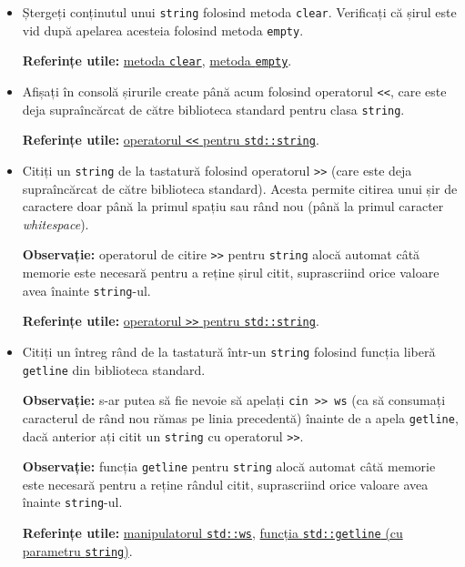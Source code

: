 \begin{enumerate}
\begin{itemize}
        \item Ștergeți conținutul unui \texttt{string} folosind metoda \texttt{clear}. Verificați că șirul este vid după apelarea acesteia folosind metoda \texttt{empty}.

        \textbf{Referințe utile:} \href{https://cplusplus.com/reference/string/string/clear/}{metoda \texttt{clear}}, \href{https://cplusplus.com/reference/string/string/empty/}{metoda \texttt{empty}}.

        \item Afișați în consolă șirurile create până acum folosind operatorul \texttt{<<}, care este deja supraîncărcat de către biblioteca standard pentru clasa \texttt{string}.

        \textbf{Referințe utile:} \href{https://cplusplus.com/reference/string/string/operator\%3C\%3C/}{operatorul \texttt{<<} pentru \texttt{std::string}}.

        \item Citiți un \texttt{string} de la tastatură folosind operatorul \texttt{>>} (care este deja supraîncărcat de către biblioteca standard). Acesta permite citirea unui șir de caractere doar până la primul spațiu sau rând nou (până la primul caracter \textit{whitespace}).

        \textbf{Observație:} operatorul de citire \texttt{>>} pentru \texttt{string} alocă automat câtă memorie este necesară pentru a reține șirul citit, suprascriind orice valoare avea înainte \texttt{string}-ul.

        \textbf{Referințe utile:} \href{https://cplusplus.com/reference/string/string/operator\%3E\%3E/}{operatorul \texttt{>>} pentru \texttt{std::string}}.

        \item Citiți un întreg rând de la tastatură într-un \texttt{string} folosind funcția liberă \texttt{getline} din biblioteca standard.

        \textbf{Observație:} s-ar putea să fie nevoie să apelați \texttt{cin >> ws} (ca să consumați caracterul de rând nou rămas pe linia precedentă) înainte de a apela \texttt{getline}, dacă anterior ați citit un \texttt{string} cu operatorul \texttt{>>}.

        \textbf{Observație:} funcția \texttt{getline} pentru \texttt{string} alocă automat câtă memorie este necesară pentru a reține rândul citit, suprascriind orice valoare avea înainte \texttt{string}-ul.
        
        \textbf{Referințe utile:} \href{https://cplusplus.com/reference/istream/ws/}{manipulatorul \texttt{std::ws}}, \href{https://cplusplus.com/reference/string/string/getline/}{funcția \texttt{std::getline} (cu parametru \texttt{string})}.


\end{itemize}
\end{enumerate}
